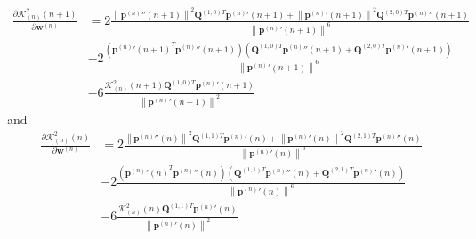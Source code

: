 \begin{equation}
\begin{split}
\frac{
\partial 
\mathcal{K}_{(n)}^{2}(n+1)
}
{
\partial \mathbf{w}^{(n)}
}
& = 
2
\frac{
\left\|{\mathbf{p}^{(n)}}''(n+1)\right\|^2
\mathbf{Q}^{(1,0)T} {\mathbf{p}^{(n)}}'(n+1)
+
\left\|{\mathbf{p}^{(n)}}'(n+1)\right\|^2
\mathbf{Q}^{(2,0)T} {\mathbf{p}^{(n)}}''(n+1)
}
{\left\| {\mathbf{p}^{(n)}}'(n+1) \right\|^{6}}\\[10pt]
& - 
2
\frac
{
\left(
{{\mathbf{p}^{(n)}}'(n+1)}^{T}
{\mathbf{p}^{(n)}}''(n+1)
\right)
\left(
\mathbf{Q}^{(1,0)T}{\mathbf{p}^{(n)}}''(n+1)
+
\mathbf{Q}^{(2,0)T}{\mathbf{p}^{(n)}}'(n+1)
\right)
}
{\left\| {\mathbf{p}^{(n)}}'(n+1) \right\|^{6}}\\[10pt]
& - 
6
\frac
{
\mathcal{K}_{(n)}^{2}(n+1)
\mathbf{Q}^{(1,0)T}{\mathbf{p}^{(n)}}'(n+1)
}
{\left\| {\mathbf{p}^{(n)}}'(n+1) \right\|^{2}}
\end{split}
\end{equation}
and
\begin{equation}
\begin{split}
\frac{
\partial 
\mathcal{K}_{(n)}^{2}(n)
}
{
\partial \mathbf{w}^{(n)}
}
& = 
2
\frac{
\left\|{\mathbf{p}^{(n)}}''(n)\right\|^2
\mathbf{Q}^{(1,1)T} {\mathbf{p}^{(n)}}'(n)
+
\left\|{\mathbf{p}^{(n)}}'(n)\right\|^2
\mathbf{Q}^{(2,1)T} {\mathbf{p}^{(n)}}''(n)
}
{\left\| {\mathbf{p}^{(n)}}'(n) \right\|^{6}}\\[10pt]
& - 
2
\frac
{
\left(
{{\mathbf{p}^{(n)}}'(n)}^{T}
{\mathbf{p}^{(n)}}''(n)
\right)
\left(
\mathbf{Q}^{(1,1)T}{\mathbf{p}^{(n)}}''(n)
+
\mathbf{Q}^{(2,1)T}{\mathbf{p}^{(n)}}'(n)
\right)
}
{\left\| {\mathbf{p}^{(n)}}'(n) \right\|^{6}}\\[10pt]
& - 
6
\frac
{
\mathcal{K}_{(n)}^{2}(n)
\mathbf{Q}^{(1,1)T}{\mathbf{p}^{(n)}}'(n)
}
{\left\| {\mathbf{p}^{(n)}}'(n) \right\|^{2}}
\end{split}
\end{equation}

